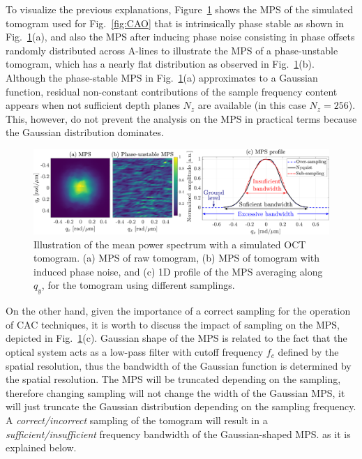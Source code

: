 To visualize the previous explanations, Figure~\ref{fig:MPSExample} shows the MPS of the simulated tomogram used for Fig.~\ref{fig:CAO} that is intrinsically phase stable as shown in Fig.~\ref{fig:MPSExample}(a), and also the MPS after inducing phase noise consisting in phase offsets randomly distributed across A-lines to illustrate the MPS of a phase-unstable tomogram, which has a nearly flat distribution as observed in Fig.~\ref{fig:MPSExample}(b). Although the phase-stable MPS in Fig.~\ref{fig:MPSExample}(a) approximates to a Gaussian function, residual non-constant contributions of the sample frequency content appears when not sufficient depth planes $N_z$ are available (in this case $N_z = 256$). This, however, do not prevent the analysis on the MPS in practical terms because the Gaussian distribution dominates.

\begin{figure}[htb!]
	\centering
	\includegraphics[width=\textwidth]{Figures/SHARP/PhaseStabilization/MPSExample.pdf}
	\caption[Illustration of the mean power spectrum with a simulated OCT tomogram.]{Illustration of the mean power spectrum with a simulated OCT tomogram. (a) MPS of raw tomogram, (b) MPS of tomogram with induced phase noise, and (c) 1D profile of the MPS averaging along $q_y$, for the tomogram using different samplings.}
	\label{fig:MPSExample}
\end{figure}

On the other hand, given the importance of a correct sampling for the operation of CAC techniques, it is worth to discuss the impact of sampling on the MPS, depicted in Fig.~\ref{fig:MPSExample}(c). Gaussian shape of the MPS is related to the fact that the optical system acts as a low-pass filter with cutoff frequency $f_c$ defined by the spatial resolution, thus the bandwidth of the Gaussian function is determined by the spatial resolution. The MPS will be truncated depending on the sampling, therefore changing sampling will not change the width of the Gaussian MPS, it will just truncate the Gaussian distribution depending on the sampling frequency. A \textit{correct/incorrect} sampling of the tomogram will result in a \textit{sufficient/insufficient} frequency bandwidth of the Gaussian-shaped MPS. as it is explained below.

